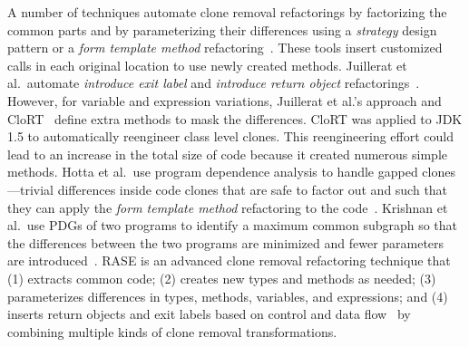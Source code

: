 A number of techniques automate clone removal refactorings by factorizing the common parts and by parameterizing their differences using a {\em strategy} design pattern or a {\em form template method} refactoring~\cite{Balazinska1999, tairas2012increasing, juillerat2007toward, hotta2012identifying, Tsantalis2013:icsm}. These tools insert customized calls in each original location to use newly created methods. Juillerat et al.~automate {\em introduce exit label} and {\em introduce return object} refactorings~\cite{juillerat2007toward}. However, for variable and expression variations, Juillerat et al.'s approach and CloRT~\cite{Balazinska1999} define extra methods to mask the differences. CloRT was applied to JDK 1.5 to automatically reengineer class level clones. This reengineering effort could lead to an increase in the total size of code because it created numerous simple methods. Hotta et al.~use program dependence analysis to handle gapped clones---trivial differences inside code clones that are safe to factor out and such that they can apply the {\em form template method} refactoring to the code~\cite{hotta2012identifying}. Krishnan et al.~use PDGs of two programs to identify a maximum common subgraph so that the differences between the two programs are minimized and fewer parameters are introduced~\cite{Tsantalis2013:icsm}. RASE is an advanced clone removal refactoring technique that (1) extracts common code; (2) creates new types and methods as needed; (3) parameterizes differences in types, methods, variables, and expressions; and (4) inserts return objects and exit labels based on control and data flow~\cite{Meng2015:ARO} by combining multiple kinds of clone removal transformations. 

